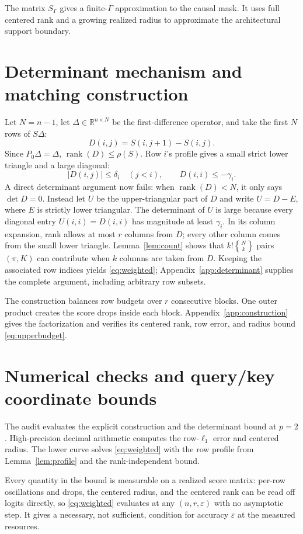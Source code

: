 \documentclass[10pt]{article} %
\theoremstyle{definition}
\DeclareMathOperator{\rank}{rank}
\newcommand{\R}{\mathbb R}
\newcommand{\Stirling}[2]{\genfrac{\{}{\}}{0pt}{}{#1}{#2}}
\begin{document}
The matrix \(S_\Gamma\) gives a finite-\(\Gamma\) approximation to the causal
mask.  It uses full centered rank and a growing realized radius to approximate
the architectural support boundary.

\section{Determinant mechanism and matching construction}\label{sec:mechanism}

Let \(N=n-1\), let \(\Delta\in\R^{n\times N}\) be the first-difference
operator, and take the first \(N\) rows of \(S\Delta\):
\[
 D(i,j)=S(i,j+1)-S(i,j).
\]
Since \(P_0\Delta=\Delta\), \(\rank(D)\le\rho(S)\).  Row \(i\)'s profile
gives a small strict lower triangle and a large diagonal:
\[
 |D(i,j)|\le\delta_i\quad(j<i),\qquad
 D(i,i)\le-\gamma_i.
\]
A direct determinant argument now fails: when \(\rank(D)<N\), it only says
\(\det D=0\).  Instead let \(U\) be the upper-triangular part of \(D\) and
write \(U=D-E\), where \(E\) is strictly lower triangular.  The determinant
of \(U\) is large because every diagonal entry \(U(i,i)=D(i,i)\) has
magnitude at least \(\gamma_i\).  In its column expansion, rank allows at
most \(r\) columns from \(D\); every other
column comes from the small lower triangle.  Lemma~\ref{lem:count} shows that
\(k!\Stirling{N}{k}\) pairs \((\pi,K)\) can contribute when \(k\)
columns are taken from \(D\).  Keeping the associated row indices yields
\eqref{eq:weighted}; Appendix~\ref{app:determinant}
supplies the complete argument, including arbitrary row subsets.

The construction balances row budgets over \(r\) consecutive blocks.  One
outer product creates the score drops inside each block.  Appendix~\ref{app:construction}
gives the factorization and verifies its centered rank,
row error, and radius bound \eqref{eq:upperbudget}.

\section{Numerical checks and query/key coordinate bounds}\label{sec:numerical}

The audit evaluates the explicit construction and the determinant bound at
\(p=2\).  High-precision decimal arithmetic computes the
row-\(\ell_1\) error and centered radius.  The lower curve solves
\eqref{eq:weighted} with the row profile from Lemma~\ref{lem:profile} and the
rank-independent bound.

Every quantity in the bound is measurable on a realized score
matrix: per-row oscillations and drops, the centered radius, and the centered
rank can be read off logits directly, so \eqref{eq:weighted} evaluates
at any \((n,r,\varepsilon)\) with no asymptotic step.  It gives a necessary,
not sufficient, condition for accuracy \(\varepsilon\) at the measured
resources.
\end{document}
